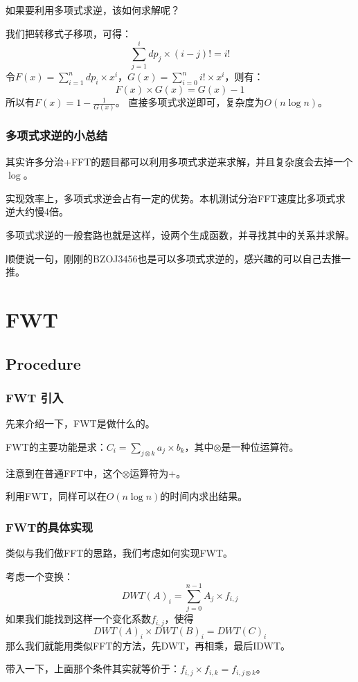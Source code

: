 \documentclass[10pt]{beamer}
\begin{document}
\begin{spacing}{1.2}
\begin{frame}
			如果要利用多项式求逆，该如何求解呢？ \pause

			我们把转移式子移项，可得：
			$$\sum_{j=1}^{i}dp_j \times (i-j)! = i!$$ \pause
			令$\displaystyle F(x)=\sum_{i=1}^{n} dp_i \times x^i$，$\displaystyle G(x)=\sum_{i=0}^{n} i! \times x^i$，则有：
			$$F(x) \times G(x) = G(x) - 1$$ \pause
			所以有$F(x)=1 - \frac{1}{G(x)}$。 \pause
			直接多项式求逆即可，复杂度为$O(n \log n)$。

		\end{frame}
		\begin{frame}
			\frametitle{多项式求逆的小总结}

			其实许多分治+FFT的题目都可以利用多项式求逆来求解，并且复杂度会去掉一个$\log$。 \pause

			实现效率上，多项式求逆会占有一定的优势。本机测试分治FFT速度比多项式求逆大约慢4倍。 \pause

			多项式求逆的一般套路也就是这样，设两个生成函数，并寻找其中的关系并求解。 \pause

			顺便说一句，刚刚的BZOJ3456也是可以多项式求逆的，感兴趣的可以自己去推一推。
		\end{frame}
		\section{FWT}
		\subsection{Procedure}
		\begin{frame}
			\frametitle{FWT 引入}
			先来介绍一下，FWT是做什么的。 \pause

			FWT的主要功能是求：$\displaystyle C_i = \sum_{j \otimes k}a_j \times b_k$，其中$\otimes$是一种位运算符。 \pause

			注意到在普通FFT中，这个$\otimes$运算符为$+$。 \pause

			利用FWT，同样可以在$O(n \log n)$的时间内求出结果。

		\end{frame}
		\begin{frame}
			\frametitle{FWT的具体实现}

			类似与我们做FFT的思路，我们考虑如何实现FWT。 \pause

			考虑一个变换：
			$$DWT(A)_i = \sum_{j=0}^{n-1} A_j \times f_{i,j}$$ \pause
			如果我们能找到这样一个变化系数$f_{i,j}$，使得
			$$DWT(A)_i \times DWT(B)_i = DWT(C)_i$$
			那么我们就能用类似FFT的方法，先DWT，再相乘，最后IDWT。\pause

			带入一下，上面那个条件其实就等价于：$f_{i,j} \times f_{i,k} = f_{i,j \otimes k}$。


\end{frame}
\end{spacing}
\end{document}
